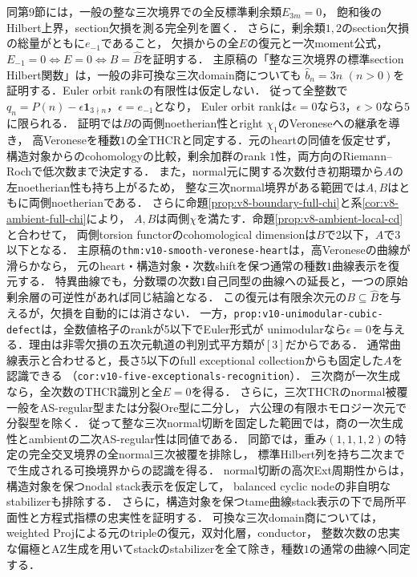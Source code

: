 \documentclass[11pt,a4paper]{ltjsarticle}
\begin{document}
\begin{description}[style=nextline]
同第9節には，一般の整な三次境界での全反標準剰余類$E_{3m}=0$，
飽和後のHilbert上界，section欠損を測る完全列を置く．
さらに，剰余類$1,2$のsection欠損の総量がともに$e_{-1}$であること，
欠損からの全$E$の復元と一次moment公式，$E_{-1}=0\iff E=0\iff B=\widehat B$を証明する．
主原稿の「整な三次境界の標準section Hilbert関数」は，一般の非可換な三次domain商についても
$\widehat b_n=3n$ $(n>0)$を証明する．Euler orbit rankの有限性は仮定しない．
従って全整数で$q_n=P(n)-\epsilon\mathbf1_{3\nmid n}$，$\epsilon=e_{-1}$となり，
Euler orbit rankは$\epsilon=0$なら$3$，$\epsilon>0$なら$5$に限られる．
証明では$B$の両側noetherian性とright $\chi_1$のVeroneseへの継承を導き，
高Veroneseを種数$1$の全THCRと同定する．元のheartの同値を仮定せず，
構造対象からのcohomologyの比較，剰余加群のrank $1$性，両方向のRiemann--Rochで低次数まで決定する．
また，normal元に関する次数付き初期環から$A$の左noetherian性も持ち上がるため，
整な三次normal境界がある範囲では$A,B$はともに両側noetherianである．
さらに命題\ref{prop:v8-boundary-full-chi}と系\ref{cor:v8-ambient-full-chi}により，
$A,B$は両側$\chi$を満たす．命題\ref{prop:v8-ambient-local-cd}と合わせて，
両側torsion functorのcohomological dimensionは$B$で2以下，$A$で3以下となる．
主原稿の\texttt{thm:v10-smooth-veronese-heart}は，高Veroneseの曲線が滑らかなら，
元のheart・構造対象・次数shiftを保つ通常の種数$1$曲線表示を復元する．
特異曲線でも，分数環の次数$1$自己同型の曲線への延長と，一つの原始剰余層の可逆性があれば同じ結論となる．
この復元は有限余次元の$B\subseteq\widehat B$を与えるが，欠損を自動的には消さない．
一方，\texttt{prop:v10-unimodular-cubic-defect}は，全数値格子のrankが5以下でEuler形式が
unimodularなら$\epsilon=0$を与える．理由は非零欠損の五次元軌道の判別式平方類が$[3]$だからである．
通常曲線表示と合わせると，長さ5以下のfull exceptional collectionからも固定した$A$を認識できる
（\texttt{cor:v10-five-exceptionals-recognition}）．
三次商が一次生成なら，全次数のTHCR識別と全$E=0$を得る．
さらに，三次THCRのnormal被覆一般をAS-regular型または分裂Ore型に二分し，
六公理の有限ホモロジー次元で分裂型を除く．
従って整な三次normal切断を固定した範囲では，商の一次生成性とambientの二次AS-regular性は同値である．
同節では，重み$(1,1,1,2)$の特定の完全交叉境界の全normal三次被覆を排除し，
標準Hilbert列を持ち二次までで生成される可換境界からの認識を得る．
normal切断の高次Ext周期性からは，構造対象を保つnodal stack表示を仮定して，
balanced cyclic nodeの非自明なstabilizerも排除する．
さらに，構造対象を保つtame曲線stack表示の下で局所平面性と方程式指標の忠実性を証明する．
可換な三次domain商については，weighted Projによる元のtripleの復元，双対化層，conductor，
整数次数の忠実な偏極とAZ生成を用いてstackのstabilizerを全て除き，種数$1$の通常の曲線へ同定する．

\end{description}
\end{document}
